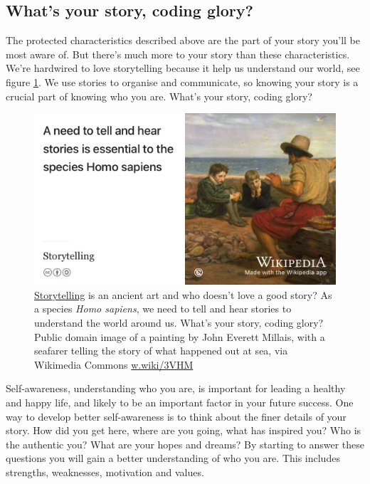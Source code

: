 \documentclass[
]{book}
\begin{document}
\hypertarget{story}{%
\subsection{What's your story, coding glory?}\label{story}}

The protected characteristics described above are the part of your story you'll be most aware of. But there's much more to your story than these characteristics. We're hardwired to love storytelling because it help us understand our world, see figure \ref{fig:storytelling-fig}. We use stories to organise and communicate, so knowing your story is a crucial part of knowing who you are. What's your story, coding glory? \citep{whatsthestory}

\begin{figure}

{\centering \includegraphics[width=1\linewidth]{images/storytelling} 

}

\caption{\href{https://en.wikipedia.org/wiki/Storytelling}{Storytelling} is an ancient art and who doesn't love a good story? As a species \emph{Homo sapiens}, we need to tell and hear stories to understand the world around us. What's your story, coding glory? Public domain image of a painting by John Everett Millais, with a seafarer telling the story of what happened out at sea, via Wikimedia Commons \href{https://w.wiki/3VHM}{w.wiki/3VHM}}\label{fig:storytelling-fig}
\end{figure}



Self-awareness, understanding who you are, is important for leading a healthy and happy life, and likely to be an important factor in your future success. One way to develop better self-awareness is to think about the finer details of your story. \citep{freeyourstory} How did you get here, where are you going, what has inspired you? Who is the authentic you? \citep{regrets} What are your hopes and dreams? By starting to answer these questions you will gain a better understanding of who you are. This includes strengths, weaknesses, motivation and values. \citep{parachute2020}
\end{document}
